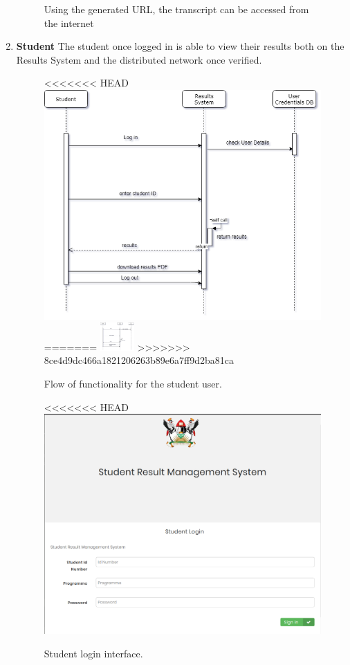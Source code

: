 \begin{enumerate}
\begin{figure}[H]
\caption{Using the generated URL, the transcript can be accessed from the internet}
\end{figure}
\newpage
\item \textbf{Student}
The student once logged in is able to view their results both on the Results System and the distributed network once verified.
\begin{figure}[H]
\caption{Flow of functionality for the student user.}
<<<<<<< HEAD
\includegraphics[scale=0.4]{images/SequenceStudent.png}
=======
\includegraphics[width=1.3cm]{images/SequenceStudent.png}
>>>>>>> 8ce4d9dc466a1821206263b89e6a7ff9d2ba81ca
\end{figure}
\begin{figure}[H]
\caption{Student login interface.}
<<<<<<< HEAD
\includegraphics[scale=0.4]{images/student_login.png}

\end{figure}
\end{enumerate}
